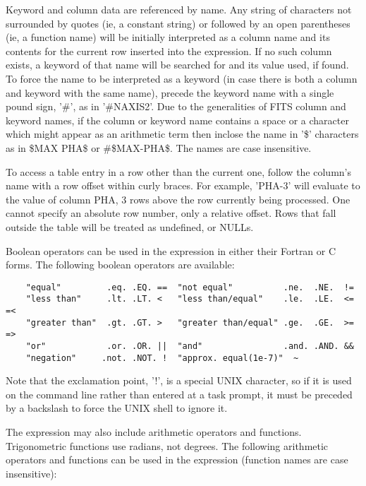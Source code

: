 \documentclass[11pt]{article}
\begin{document}
Keyword and column data  are referenced by   name.  Any  string of
characters not surrounded by    quotes (ie, a constant  string)   or
followed by   an open parentheses (ie,   a  function name)   will be
initially interpreted   as a column  name and  its contents for the
current row inserted into the expression.  If no such column exists,
a keyword of that  name will be searched for  and its value used, if
found.  To force the  name to be  interpreted as a keyword (in case
there is both a column and keyword with the  same name), precede the
keyword name with a single pound sign, '\#', as in '\#NAXIS2'.  Due to
the generalities of FITS column and  keyword names, if the column or
keyword name  contains a space or a  character which might appear as
an arithmetic  term then inclose  the  name in '\$'  characters as in
\$MAX PHA\$ or \#\$MAX-PHA\$.  The names are case insensitive.

To access a table entry in a row other  than the current one, follow
the  column's name  with  a row  offset  within  curly  braces.  For
example, 'PHA{-3}' will evaluate to the value  of column PHA, 3 rows
above  the  row currently  being processed.   One  cannot specify an
absolute row number, only a relative offset.  Rows that fall outside
the table will be treated as undefined, or NULLs.

Boolean   operators can be  used in  the expression  in either their
Fortran or C forms.  The following boolean operators are available:

\begin{verbatim}
    "equal"         .eq. .EQ. ==  "not equal"          .ne.  .NE.  !=
    "less than"     .lt. .LT. <   "less than/equal"    .le.  .LE.  <= =<
    "greater than"  .gt. .GT. >   "greater than/equal" .ge.  .GE.  >= =>
    "or"            .or. .OR. ||  "and"                .and. .AND. &&
    "negation"     .not. .NOT. !  "approx. equal(1e-7)"  ~
\end{verbatim}

Note  that the exclamation point,  '!', is a special UNIX character, so
if it is used  on the command line rather than entered at a task
prompt, it must be  preceded by a backslash to force the UNIX shell to
ignore it.

The expression may  also include arithmetic operators and functions.
Trigonometric  functions use  radians,  not degrees.  The  following
arithmetic  operators and  functions  can be  used in the expression
(function names are case insensitive):
\end{document}
